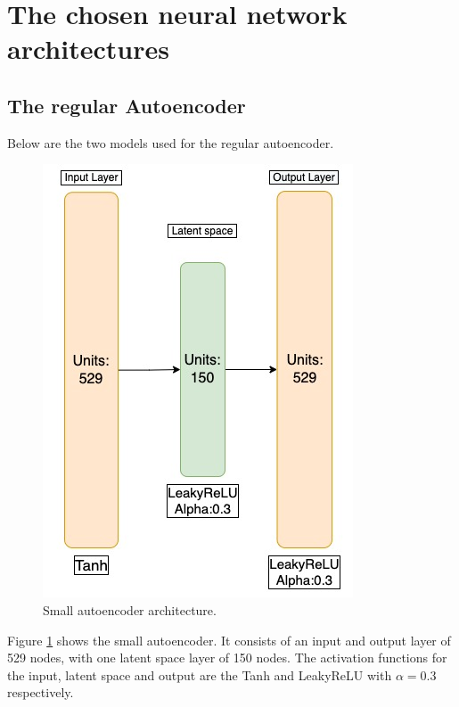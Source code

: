 \section{The chosen neural network architectures}

\subsection*{The regular Autoencoder}

Below are the two models used for the regular autoencoder. 
\begin{figure}[H]
    \centering
    \includegraphics[scale=0.4]{Figures/nnarchitect/ae_small.jpeg}
    \caption[AE | Small network architecture]{Small autoencoder architecture.}
    \label{fig:ae_small}
\end{figure}

Figure \ref{fig:ae_small} shows the small autoencoder. It consists of an input and output layer of 529 nodes, with 
one latent space layer of 150 nodes. The activation functions for the input, latent space and output are the Tanh and 
LeakyReLU with $\alpha=0.3$ respectively.


